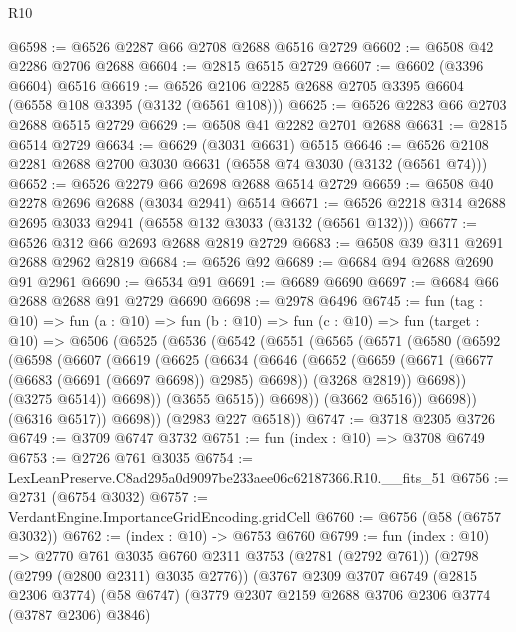 \begin{lexlean}{R10}
\begin{coremodule}
@6598 := @6526 @2287 @66 @2708 @2688 @6516 @2729
@6602 := @6508 @42 @2286 @2706 @2688
@6604 := @2815 @6515 @2729
@6607 := @6602 (@3396 @6604) @6516
@6619 := @6526 @2106 @2285 @2688 @2705 @3395 @6604 (@6558 @108 @3395 (@3132 (@6561 @108)))
@6625 := @6526 @2283 @66 @2703 @2688 @6515 @2729
@6629 := @6508 @41 @2282 @2701 @2688
@6631 := @2815 @6514 @2729
@6634 := @6629 (@3031 @6631) @6515
@6646 := @6526 @2108 @2281 @2688 @2700 @3030 @6631 (@6558 @74 @3030 (@3132 (@6561 @74)))
@6652 := @6526 @2279 @66 @2698 @2688 @6514 @2729
@6659 := @6508 @40 @2278 @2696 @2688 (@3034 @2941) @6514
@6671 := @6526 @2218 @314 @2688 @2695 @3033 @2941 (@6558 @132 @3033 (@3132 (@6561 @132)))
@6677 := @6526 @312 @66 @2693 @2688 @2819 @2729
@6683 := @6508 @39 @311 @2691 @2688 @2962 @2819
@6684 := @6526 @92
@6689 := @6684 @94 @2688 @2690 @91 @2961
@6690 := @6534 @91
@6691 := @6689 @6690
@6697 := @6684 @66 @2688 @2688 @91 @2729 @6690
@6698 := @2978 @6496
@6745 := fun (tag : @10) =>
  fun (a : @10) =>
  fun (b : @10) =>
  fun (c : @10) =>
  fun (target : @10) =>
  @6506
    (@6525
      (@6536
        (@6542
          (@6551
            (@6565
              (@6571
                (@6580
                  (@6592
                    (@6598
                      (@6607
                        (@6619
                          (@6625
                            (@6634
                              (@6646
                                (@6652
                                  (@6659
                                    (@6671 (@6677 (@6683 (@6691 (@6697 @6698)) @2985) @6698))
                                    (@3268 @2819))
                                  @6698))
                              (@3275 @6514))
                            @6698))
                        (@3655 @6515))
                      @6698))
                  (@3662 @6516))
                @6698))
            (@6316 @6517))
          @6698))
      (@2983 @227 @6518))
@6747 := @3718 @2305 @3726
@6749 := @3709 @6747 @3732
@6751 := fun (index : @10) => @3708 @6749
@6753 := @2726 @761 @3035
@6754 := LexLeanPreserve.C8ad295a0d9097be233aee06c62187366.R10.__fits_51
@6756 := @2731 (@6754 @3032)
@6757 := VerdantEngine.ImportanceGridEncoding.gridCell
@6760 := @6756 (@58 (@6757 @3032))
@6762 := (index : @10) -> @6753 @6760
@6799 := fun (index : @10) =>
  @2770
    @761
    @3035
    @6760
    @2311
    @3753
    (@2781 (@2792 @761))
    (@2798 (@2799 (@2800 @2311) @3035 @2776))
    (@3767
      @2309
      @3707
      @6749
      (@2815 @2306 @3774)
      (@58 @6747)
      (@3779 @2307 @2159 @2688 @3706 @2306 @3774 (@3787 @2306) @3846)

\end{coremodule}
\end{lexlean}
